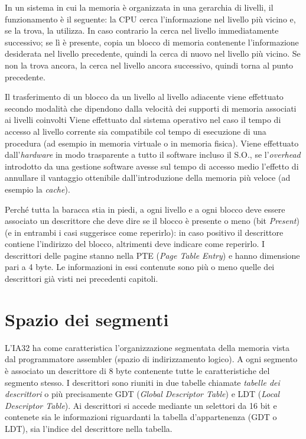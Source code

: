 In un sistema in cui la memoria è organizzata in una gerarchia di livelli, il funzionamento è il seguente: la CPU cerca l'informazione nel livello più vicino e, se la trova, la utilizza. In caso contrario la cerca nel livello immediatamente successivo; se lì è presente, copia un blocco di memoria contenente l'informazione desiderata nel livello precedente, quindi la cerca di nuovo nel livello più vicino. Se non la trova ancora, la cerca nel livello ancora successivo, quindi torna al punto precedente.

Il trasferimento di un blocco da un livello al livello adiacente viene effettuato secondo modalità che dipendono dalla velocità dei supporti di memoria associati ai livelli coinvolti Viene effettuato dal sistema operativo nel caso il tempo di accesso al livello corrente sia compatibile col tempo di esecuzione di una procedura (ad esempio in memoria virtuale o in memoria fisica). Viene effettuato dall'\textit{hardware} in modo trasparente a tutto il
software incluso il S.O., se l'\textit{overhead} introdotto da una gestione software avesse sul tempo di accesso medio l'effetto di annullare il vantaggio ottenibile dall'introduzione della memoria più veloce (ad esempio la \textit{cache}).


Perché tutta la baracca stia in piedi, a ogni livello e a ogni blocco deve essere associato un descrittore che deve dire se il blocco è presente o meno (bit \textit{Present}) (e in entrambi i casi suggerisce come reperirlo): in caso positivo il descrittore contiene l'indirizzo del blocco, altrimenti deve indicare come reperirlo. I descrittori delle pagine stanno nella PTE (\textit{Page Table Entry}) e hanno dimensione pari a 4 byte. Le informazioni in essi contenute sono più o meno quelle dei descrittori già visti nei precedenti capitoli. 

\section{Spazio dei segmenti}
\label{sec:segmentiSpace}

L'IA32 ha come caratteristica l'organizzazione segmentata della memoria vista dal programmatore assembler (spazio di indirizzamento logico). A ogni segmento è associato un descrittore di 8 byte contenente tutte le
caratteristiche del segmento stesso. I descrittori sono riuniti in due tabelle chiamate \textit{tabelle dei descrittori} o più precisamente GDT (\textit{Global Descriptor Table}) e LDT (\textit{Local Descriptor Table}). Ai descrittori si accede mediante un selettori da 16 bit e contenete sia le informazioni riguardanti la tabella d'appartenenza (GDT o LDT), sia l'indice del descrittore nella tabella.

